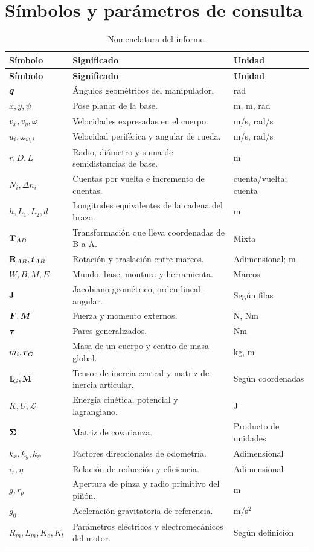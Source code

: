 \chapter{Símbolos y parámetros de consulta}
\begin{longtable}{@{}P{31mm}P{82mm}P{28mm}@{}}
\caption{Nomenclatura del informe.}\\
\toprule\textbf{Símbolo} & \textbf{Significado} & \textbf{Unidad}\\\midrule\endfirsthead
\toprule\textbf{Símbolo} & \textbf{Significado} & \textbf{Unidad}\\\midrule\endhead
$\boldsymbol{q}$ & Ángulos geométricos del manipulador. & rad\\
$x,y,\psi$ & Pose planar de la base. & m, m, rad\\
$v_x,v_y,\omega$ & Velocidades expresadas en el cuerpo. & m/s, rad/s\\
$u_i,\omega_{w,i}$ & Velocidad periférica y angular de rueda. & m/s, rad/s\\
$r,D,L$ & Radio, diámetro y suma de semidistancias de base. & m\\
$N_i,\Delta n_i$ & Cuentas por vuelta e incremento de cuentas. & cuenta/vuelta; cuenta\\
$h,L_1,L_2,d$ & Longitudes equivalentes de la cadena del brazo. & m\\
$\mathbf{T}_{AB}$ & Transformación que lleva coordenadas de B a A. & Mixta\\
$\mathbf{R}_{AB},\boldsymbol{t}_{AB}$ & Rotación y traslación entre marcos. & Adimensional; m\\
$W,B,M,E$ & Mundo, base, montura y herramienta. & Marcos\\
$\mathbf{J}$ & Jacobiano geométrico, orden lineal--angular. & Según filas\\
$\boldsymbol{F},\boldsymbol{M}$ & Fuerza y momento externos. & N, N\textperiodcentered{}m\\
$\boldsymbol{\tau}$ & Pares generalizados. & N\textperiodcentered{}m\\
$m_i,\boldsymbol{r}_G$ & Masa de un cuerpo y centro de masa global. & kg, m\\
$\mathbf{I}_G,\mathbf{M}$ & Tensor de inercia central y matriz de inercia articular. & Según coordenadas\\
$K,U,\mathcal L$ & Energía cinética, potencial y lagrangiano. & J\\
$\mathbf{\Sigma}$ & Matriz de covarianza. & Producto de unidades\\
$k_x,k_y,k_\psi$ & Factores direccionales de odometría. & Adimensional\\
$i_r,\eta$ & Relación de reducción y eficiencia. & Adimensional\\
$g,r_p$ & Apertura de pinza y radio primitivo del piñón. & m\\
$g_0$ & Aceleración gravitatoria de referencia. & m/s$^2$\\
$R_m,L_m,K_e,K_t$ & Parámetros eléctricos y electromecánicos del motor. & Según definición\\
\bottomrule
\end{longtable}

